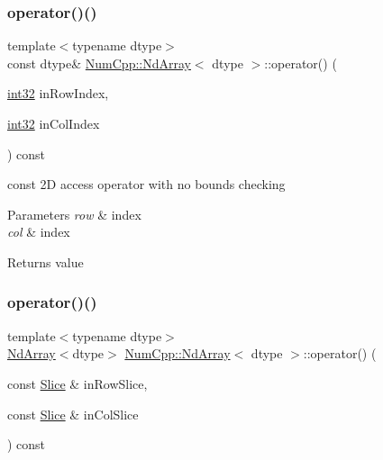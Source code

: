 \subsubsection{\texorpdfstring{operator()()}{operator()()}\hspace{0.1cm}{\footnotesize\ttfamily [2/5]}}
{\footnotesize\ttfamily template$<$typename dtype$>$ \\
const dtype\& \mbox{\hyperlink{class_num_cpp_1_1_nd_array}{Num\+Cpp\+::\+Nd\+Array}}$<$ dtype $>$\+::operator() (\begin{DoxyParamCaption}\item[{\mbox{\hyperlink{namespace_num_cpp_acf3eb1592f8b248ff0a236634864633c}{int32}}}]{in\+Row\+Index,  }\item[{\mbox{\hyperlink{namespace_num_cpp_acf3eb1592f8b248ff0a236634864633c}{int32}}}]{in\+Col\+Index }\end{DoxyParamCaption}) const\hspace{0.3cm}{\ttfamily [inline]}}

const 2D access operator with no bounds checking


\begin{DoxyParams}{Parameters}
{\em row} & index \\
\hline
{\em col} & index \\
\hline
\end{DoxyParams}
\begin{DoxyReturn}{Returns}
value 
\end{DoxyReturn}
\mbox{\label{class_num_cpp_1_1_nd_array_a1e2099923008c0b6bd8e889e043329b1}} 
\subsubsection{\texorpdfstring{operator()()}{operator()()}\hspace{0.1cm}{\footnotesize\ttfamily [3/5]}}
{\footnotesize\ttfamily template$<$typename dtype$>$ \\
\mbox{\hyperlink{class_num_cpp_1_1_nd_array}{Nd\+Array}}$<$dtype$>$ \mbox{\hyperlink{class_num_cpp_1_1_nd_array}{Num\+Cpp\+::\+Nd\+Array}}$<$ dtype $>$\+::operator() (\begin{DoxyParamCaption}\item[{const \mbox{\hyperlink{class_num_cpp_1_1_slice}{Slice}} \&}]{in\+Row\+Slice,  }\item[{const \mbox{\hyperlink{class_num_cpp_1_1_slice}{Slice}} \&}]{in\+Col\+Slice }\end{DoxyParamCaption}) const\hspace{0.3cm}{\ttfamily [inline]}}

